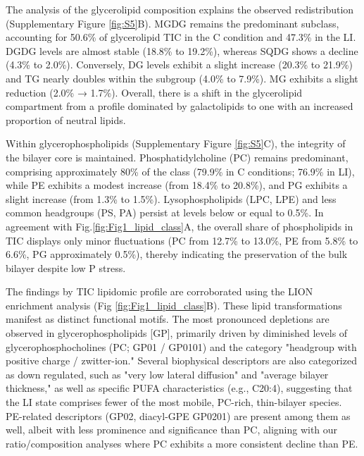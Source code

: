 \documentclass[10pt,letterpaper]{article}
\begin{document}
\begin{itemize}
The analysis of the glycerolipid composition explains the observed redistribution (Supplementary Figure \ref{fig:S5}B). MGDG remains the predominant subclass, accounting for 50.6\% of glycerolipid TIC in the C condition and 47.3\% in the LI. DGDG levels are almost stable (18.8\% to 19.2\%), whereas SQDG shows a decline (4.3\% to 2.0\%). Conversely, DG levels exhibit  a slight increase (20.3\% to 21.9\%) and TG nearly doubles within the subgroup (4.0\% to 7.9\%). MG exhibits a slight reduction (2.0\% → 1.7\%). Overall, there is a shift in the glycerolipid compartment from a profile dominated by galactolipids to one with an increased proportion of neutral lipids.

Within glycerophospholipids (Supplementary Figure \ref{fig:S5}C), the integrity of the bilayer core is maintained. Phosphatidylcholine (PC) remains predominant, comprising approximately 80\% of the class (79.9\% in C conditions; 76.9\% in LI), while PE exhibits a modest increase (from 18.4\% to 20.8\%), and PG exhibits a slight increase (from 1.3\% to 1.5\%). Lysophospholipids (LPC, LPE) and less common headgroups (PS, PA) persist at levels below or equal to 0.5\%. In agreement with Fig.\ref{fig:Fig1_lipid_class}A, the overall share of phospholipids in TIC displays only minor fluctuations (PC from 12.7\% to 13.0\%, PE from 5.8\% to 6.6\%, PG approximately 0.5\%), thereby indicating the preservation of the bulk bilayer despite low P stress.

The findings by TIC lipidomic profile are corroborated using the LION enrichment analysis (Fig \ref{fig:Fig1_lipid_class}B). These lipid transformations manifest as distinct functional motifs. The most pronounced depletions are observed in glycerophospholipids [GP], primarily driven by diminished levels of glycerophosphocholines (PC; GP01 / GP0101) and the category "headgroup with positive charge / zwitter-ion." Several biophysical descriptors are also categorized as down regulated, such as "very low lateral diffusion" and "average bilayer thickness," as well as specific PUFA characteristics (e.g., C20:4), suggesting that the LI state comprises fewer of the most mobile, PC-rich, thin-bilayer species. PE-related descriptors (GP02, diacyl-GPE GP0201) are present among them as well, albeit with less prominence and significance than PC, aligning with our ratio/composition analyses where PC exhibits a more consistent decline than PE. 


\end{itemize}
\end{document}
